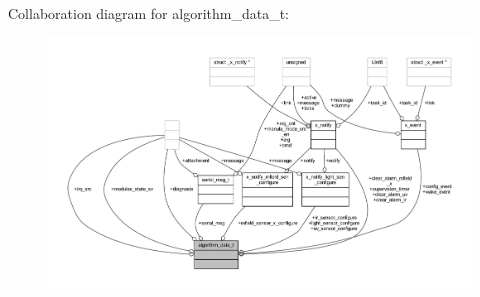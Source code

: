 Collaboration diagram for algorithm\+\_\+data\+\_\+t\+:\nopagebreak
\begin{figure}[H]
\begin{center}
\leavevmode
\includegraphics[width=350pt]{dc/d2c/a00893}
\end{center}
\end{figure}
